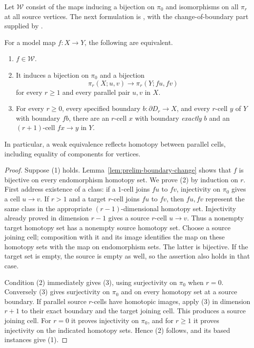 Let $\mathcal W$ consist of the maps inducing a bijection on
$\pi_0$ and isomorphisms on all $\pi_r$ at all source vertices.
The next formulation is \cite[Theorem~4.18]{Ara2013}, with the
change-of-boundary part supplied by
\cite[Theorem~4.13 and Corollaries~4.14--4.15]{Ara2013}.

\begin{proposition}\label{prop:weak-test}
For a model map $f:X\to Y$, the following are equivalent.
\begin{enumerate}
\item $f\in\mathcal W$.
\item It induces a bijection on $\pi_0$ and a bijection
\[
 \pi_r(X;u,v)\longrightarrow\pi_r(Y;fu,fv)
\]
for every $r\ge1$ and every parallel pair $u,v$ in $X$.
\item For every $r\ge0$, every specified boundary
$b:\partial D_r\to X$, and every $r$-cell $y$ of $Y$ with
boundary $fb$, there are an $r$-cell $x$ with boundary
\emph{exactly} $b$ and an $(r+1)$-cell $fx\to y$ in $Y$.
\end{enumerate}
In particular, a weak equivalence reflects homotopy between
parallel cells, including equality of components for vertices.
\end{proposition}

\begin{proof}
Suppose (1) holds.  Lemma~\ref{lem:prelim-boundary-change} shows
that $f$ is bijective on every endomorphism homotopy set.
We prove (2) by induction on $r$.  First address existence of
a class: if a $1$-cell joins $fu$ to $fv$, injectivity on
$\pi_0$ gives a cell $u\to v$.  If $r>1$ and a target
$r$-cell joins $fu$ to $fv$, then $fu,fv$ represent the same
class in the appropriate $(r-1)$-dimensional homotopy set.
Injectivity already proved in dimension $r-1$ gives a source
$r$-cell $u\to v$.  Thus a nonempty target homotopy set has
a nonempty source homotopy set.  Choose a source joining cell;
composition with it and its image identifies the map on these
homotopy sets with the map on endomorphism sets.  The latter
is bijective.  If the target set is empty, the source is empty
as well, so the assertion also holds in that case.

Condition (2) immediately gives (3), using surjectivity on
$\pi_0$ when $r=0$.  Conversely (3) gives surjectivity on
$\pi_0$ and on every homotopy set at a source boundary.
If parallel source $r$-cells have homotopic images, apply
(3) in dimension $r+1$ to their exact boundary and the target
joining cell.  This produces a source joining cell.  For
$r=0$ it proves injectivity on $\pi_0$, and for $r\ge1$
it proves injectivity on the indicated homotopy sets.  Hence
(2) follows, and its based instances give (1).
\end{proof}

